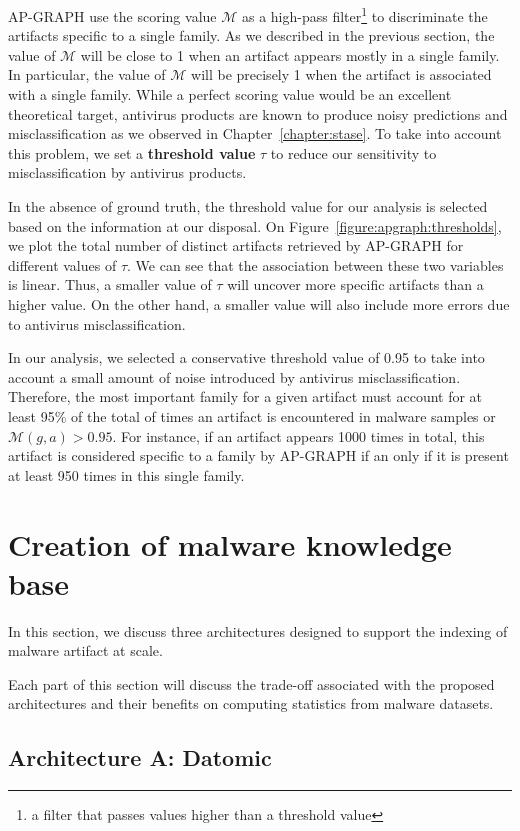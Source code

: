 AP-GRAPH use the scoring value $\mathcal{M}$ as a high-pass filter\footnote{a filter that passes values higher than a threshold value} to discriminate the artifacts specific to a single family.
As we described in the previous section, the value of $\mathcal{M}$ will be close to 1 when an artifact appears mostly in a single family.
In particular, the value of $\mathcal{M}$ will be precisely 1 when the artifact is associated with a single family.
While a perfect scoring value would be an excellent theoretical target, antivirus products are known to produce noisy predictions and misclassification as we observed in Chapter~\ref{chapter:stase}.
To take into account this problem, we set a \textbf{threshold value} $\tau$ to reduce our sensitivity to misclassification by antivirus products.

In the absence of ground truth, the threshold value for our analysis is selected based on the information at our disposal.
On Figure~\ref{figure:apgraph:thresholds}, we plot the total number of distinct artifacts retrieved by AP-GRAPH for different values of $\tau$.
We can see that the association between these two variables is linear.
Thus, a smaller value of $\tau$ will uncover more specific artifacts than a higher value.
On the other hand, a smaller value will also include more errors due to antivirus misclassification.

In our analysis, we selected a conservative threshold value of 0.95 to take into account a small amount of noise introduced by antivirus misclassification.
Therefore, the most important family for a given artifact must account for at least 95\% of the total of times an artifact is encountered in malware samples or $\mathcal{M}(\mathit{g}, \mathit{a}) > 0.95$.
For instance, if an artifact appears 1000 times in total, this artifact is considered specific to a family by AP-GRAPH if an only if it is present at least 950 times in this single family.
\section{Creation of malware knowledge base}
In this section, we discuss three architectures designed to support the indexing of malware artifact at scale.

Each part of this section will discuss the trade-off associated with the proposed architectures and their benefits on computing statistics from malware datasets.
\subsection{Architecture A: Datomic}

